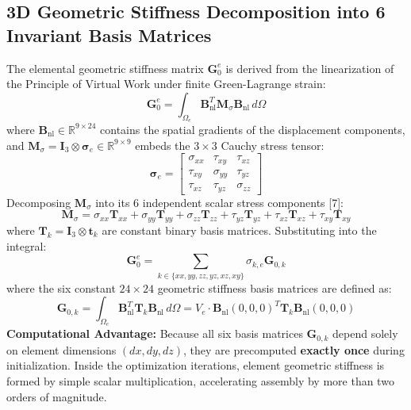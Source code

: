 \documentclass[11pt, a4paper]{article}
\begin{document}
\subsection{3D Geometric Stiffness Decomposition into 6 Invariant Basis Matrices}
The elemental geometric stiffness matrix $\mathbf{G}_0^e$ is derived from the linearization of the Principle of Virtual Work under finite Green-Lagrange strain:
\begin{equation}
\mathbf{G}_0^e = \int_{\Omega_e} \mathbf{B}_{\text{nl}}^T \mathbf{M}_\sigma \mathbf{B}_{\text{nl}} \, d\Omega
\end{equation}
where $\mathbf{B}_{\text{nl}} \in \mathbb{R}^{9 \times 24}$ contains the spatial gradients of the displacement components, and $\mathbf{M}_\sigma = \mathbf{I}_3 \otimes \boldsymbol{\sigma}_e \in \mathbb{R}^{9 \times 9}$ embeds the $3 \times 3$ Cauchy stress tensor:
\begin{equation}
\boldsymbol{\sigma}_e = \begin{bmatrix}
\sigma_{xx} & \tau_{xy} & \tau_{xz} \\
\tau_{xy} & \sigma_{yy} & \tau_{yz} \\
\tau_{xz} & \tau_{yz} & \sigma_{zz}
\end{bmatrix}
\end{equation}
Decomposing $\mathbf{M}_\sigma$ into its 6 independent scalar stress components [7]:
\begin{equation}
\mathbf{M}_\sigma = \sigma_{xx} \mathbf{T}_{xx} + \sigma_{yy} \mathbf{T}_{yy} + \sigma_{zz} \mathbf{T}_{zz} + \tau_{yz} \mathbf{T}_{yz} + \tau_{xz} \mathbf{T}_{xz} + \tau_{xy} \mathbf{T}_{xy}
\end{equation}
where $\mathbf{T}_k = \mathbf{I}_3 \otimes \mathbf{t}_k$ are constant binary basis matrices. Substituting into the integral:
\begin{equation}
\mathbf{G}_0^e = \sum_{k \in \{xx, yy, zz, yz, xz, xy\}} \sigma_{k, e} \mathbf{G}_{0, k}
\end{equation}
where the six constant $24 \times 24$ geometric stiffness basis matrices are defined as:
\begin{equation}
\mathbf{G}_{0, k} = \int_{\Omega_e} \mathbf{B}_{\text{nl}}^T \mathbf{T}_k \mathbf{B}_{\text{nl}} \, d\Omega = V_e \cdot \mathbf{B}_{\text{nl}}(0,0,0)^T \mathbf{T}_k \mathbf{B}_{\text{nl}}(0,0,0)
\end{equation}
\textbf{Computational Advantage:} Because all six basis matrices $\mathbf{G}_{0, k}$ depend solely on element dimensions $(dx, dy, dz)$, they are precomputed \textbf{exactly once} during initialization. Inside the optimization iterations, element geometric stiffness is formed by simple scalar multiplication, accelerating assembly by more than two orders of magnitude.
\end{document}
